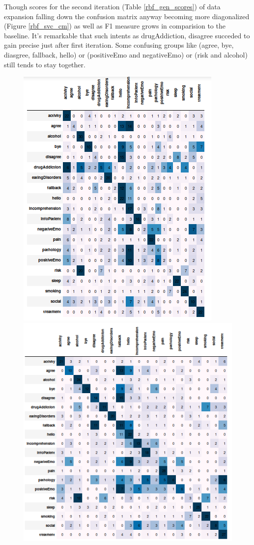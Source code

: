 \documentclass[11pt]{article}
\begin{document}
Though scores for the second iteration (Table \ref{rbf_gen_scores}) of data expansion falling down the confusion matrix anyway becoming more diagonalized (Figure \ref{rbf_svc_cm}) as well as F1 measure grows in comparision to the baseline. It's remarkable that such intents as drugAddiction, disagree succeded to gain precise just after first iteration. Some confusing groups like (agree, bye, diasgree, fallback, hello) or (positiveEmo and negativeEmo) or (risk and alcohol) still tends to stay together.

\begin{figure}[h]
	\centering
	\includegraphics[scale=0.25]{svc0_cm.png}
	\includegraphics[scale=0.25]{svc1_cm.png}

\end{figure}
\end{document}
